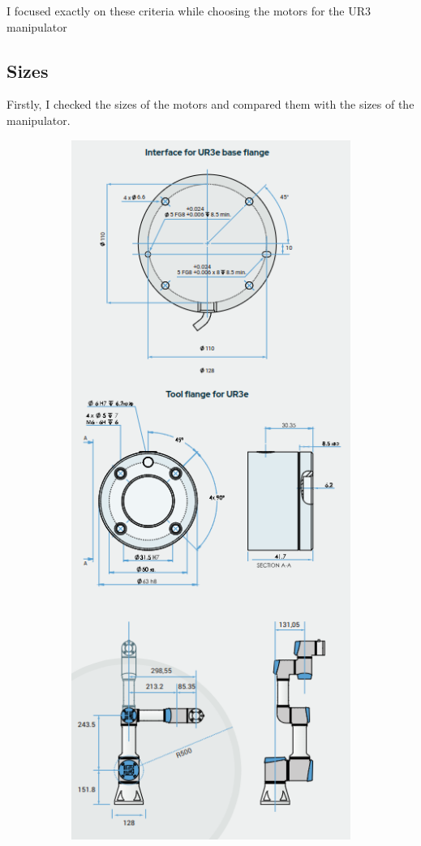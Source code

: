 \documentclass{article}
\begin{document}
I focused exactly on these criteria while choosing the motors for the UR3 manipulator


\subsection{Sizes}

Firstly, I checked the sizes of the motors and compared them with the sizes of the manipulator.


\begin{figure}[H]
\centering
\begin{subfigure}{0.45\textwidth}
    \centering
    \includegraphics[scale=0.35]{manipulator_sizes.png}

\end{subfigure}
\end{figure}
\end{document}
